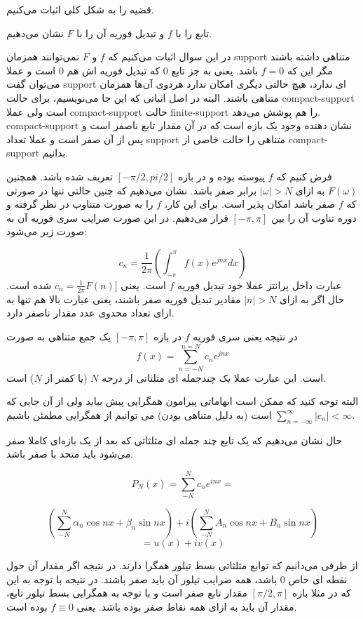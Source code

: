 \documentclass[12pt]{article}
\begin{document}
قضیه را به شکل کلی اثبات می‌کنیم.

تابع را با $f$ و تبدیل فوریه آن را با $F$ نشان می‌دهیم.

در این سوال اثبات می‌کنیم که $f$ و  $F$ نمی‌توانند همزمان support متناهی داشته باشند مگر این که $f=0$ باشد. یعنی به جز تابع $0$ که تبدیل فوریه‌ اش هم $0$ است و عملا می‌توان گفت support ای ندارد، هیچ حالتی دیگری امکان ندارد هردوی آن‌ها همزمان متناهی باشند. البته در اصل اثباتی که این جا می‌نویسیم، برای حالت compact-support است ولی  عملا compact-support حالت finite-support را هم پوشش می‌دهد. compact-support نشان دهنده وجود یک بازه است که در آن مقدار تابع ناصفر است و پس از آن صفر است و عملا تعداد support متناهی را حالت خاصی از compact-support بدانیم.



فرض کنیم که $f$ پیوسته بوده و در بازه
$[-\pi/2 , pi/2]$
تعریف شده باشد. همچنین 
$F(\omega)$
به ازای 
$|\omega|>N$
برابر صفر باشد. نشان می‌دهیم که چنین حالتی تنها در صورتی که $f$ صفر باشد امکان پذیر است. برای این کار، $f$ را به صورت متناوب در نظر گرفته و دوره تناوب آن را بین
$[-\pi , \pi]$
قرار می‌دهیم. در این صورت ضرایب سری فوریه آن به صورت زیر می‌شود:

$$c_n = \frac{1}{2\pi} (\int_{-\pi}^{\pi} f(x) e^{j n x} dx)$$
عبارت داخل پرانتز عملا خود تبدیل فوریه $f$ است. یعنی
$c_n = \frac{1}{2\pi} F(n)]$
شده است. حال اگر به ازای
$|n|>N$
مقادیر تبدیل فوریه صفر باشند، یعنی عبارت بالا هم تنها به ازای تعداد محدوی عدد مقدار ناصفر دارد.

در نتیجه یعنی سری فوریه $f$ در بازه 
$[-\pi , \pi]$
یک جمع متناهی به صورت
$$f(x)= \sum_{n=-N}^{n=N} c_n e^{j n x}$$
است. این عبارت عملا یک چندجمله ای مثلثاتی از درجه $N$ (یا کمتر از $N$) است.

البته توجه کنید که ممکن است ابهاماتی پیرامون همگرایی پیش بیاید ولی از آن جایی که 
$\sum_{n=-\infty}^{\infty} |c_n| <\infty$
است (به دلیل متناهی بودن) می توانیم از همگرایی مطمئن باشیم.

حال نشان می‌دهیم که یک تابع چند جمله ای مثلثاتی که بعد از یک بازه‌ای کاملا صفر می‌شود باید متحد با صفر باشد.


$$
P_{N}(x)=\sum_{-N}^{N} c_{n} e^{i n x}=
$$


$$
\left(\sum_{-N}^{N} \alpha_{n} \cos n x+\beta_{n} \sin n x\right)+i\left(\sum_{-N}^{N} A_{n} \cos n x+B_{n} \sin n x\right)
$$
$$=u(x) + i v(x)$$

از طرفی می‌دانیم که توابع مثلثاتی بسط تیلور همگرا دارند. در نتیجه اگر مقدار آن حول نقطه ای خاص $0$ باشد، همه ضرایب تیلور آن باید صفر باشند. در نتیجه با توجه به این که در مثلا بازه
 $[\pi/2 , \pi]$
 مقدار تابع صفر است و با توجه به همگرایی بسط تیلور تابع، مقدار آن باید به ازای همه نقاط صفر بوده باشد. یعنی $f\equiv0$ بوده است.
 
\end{document}
